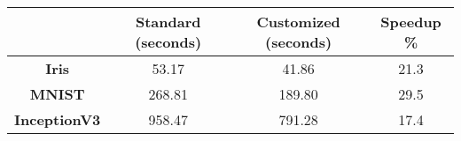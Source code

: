 \scriptsize

\begin{tabular}{|c|c|c|c|} 
\hline
 & \textbf{Standard (seconds)} & \textbf{Customized (seconds)} & \textbf{Speedup \%}\\
\hline
\textbf{Iris} & 53.17 & 41.86 &  21.3\\
\hline
\textbf{MNIST} & 268.81 & 189.80 & 29.5 \\
\hline
\textbf{InceptionV3} & 958.47 & 791.28 & 17.4 \\
\hline
\end{tabular}
